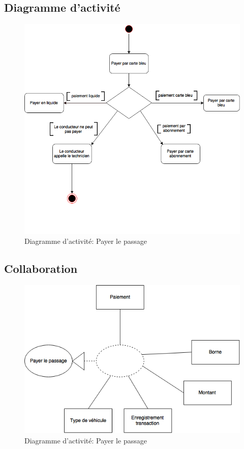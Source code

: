 \subsection{Diagramme d'activité}
\begin{figure}[h]
    \centering
    \includegraphics[scale=0.6]{02_Desenvolvimento/TD2/images/DAPayePassage.png}
    \caption{Diagramme d'activité: Payer le passage}
\end{figure}
\newpage
\subsection{Collaboration}
\begin{figure}[h]
    \centering
    \includegraphics[scale=0.6]{02_Desenvolvimento/TD2/images/ColaPayer.png}
    \caption{Diagramme d'activité: Payer le passage}
\end{figure}
